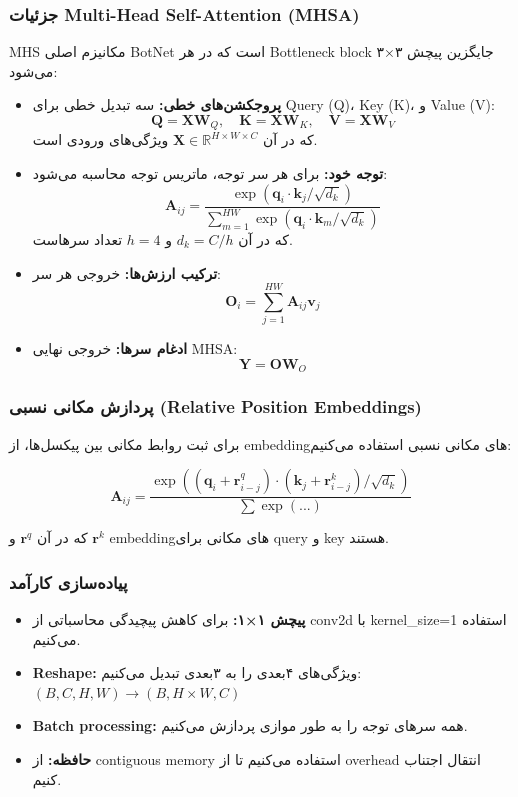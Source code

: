 \documentclass[12pt,a4paper]{article}
\theoremstyle{definition}
\begin{document}
\subsubsection*{جزئیات Multi-Head Self-Attention (MHSA)}
MHS مکانیزم اصلی BotNet است که در هر Bottleneck block جایگزین پیچش ۳×۳ می‌شود:

\begin{itemize}
    \item \textbf{پروجکشن‌های خطی:} سه تبدیل خطی برای Query (Q)، Key (K)، و Value (V):
    \[
    \mathbf{Q} = \mathbf{X} \mathbf{W}_Q, \quad \mathbf{K} = \mathbf{X} \mathbf{W}_K, \quad \mathbf{V} = \mathbf{X} \mathbf{W}_V
    \]
    که در آن $\mathbf{X} \in \mathbb{R}^{H \times W \times C}$ ویژگی‌های ورودی است.

    \item \textbf{توجه خود:} برای هر سر توجه، ماتریس توجه محاسبه می‌شود:
    \[
    \mathbf{A}_{ij} = \frac{\exp(\mathbf{q}_i \cdot \mathbf{k}_j / \sqrt{d_k})}{\sum_{m=1}^{HW} \exp(\mathbf{q}_i \cdot \mathbf{k}_m / \sqrt{d_k})}
    \]
    که در آن $d_k = C/h$ و $h=4$ تعداد سرهاست.

    \item \textbf{ترکیب ارزش‌ها:} خروجی هر سر:
    \[
    \mathbf{O}_i = \sum_{j=1}^{HW} \mathbf{A}_{ij} \mathbf{v}_j
    \]

    \item \textbf{ادغام سرها:} خروجی نهایی MHSA:
    \[
    \mathbf{Y} = \mathbf{O} \mathbf{W}_O
    \]
\end{itemize}

\subsubsection*{پردازش مکانی نسبی (Relative Position Embeddings)}
برای ثبت روابط مکانی بین پیکسل‌ها، از embeddingهای مکانی نسبی استفاده می‌کنیم:

\[
\mathbf{A}_{ij} = \frac{\exp((\mathbf{q}_i + \mathbf{r}_{i-j}^q) \cdot (\mathbf{k}_j + \mathbf{r}_{i-j}^k) / \sqrt{d_k})}{\sum \exp(...)}
\]

که در آن $\mathbf{r}^q$ و $\mathbf{r}^k$ embeddingهای مکانی برای query و key هستند.

\subsubsection*{پیاده‌سازی کارآمد}
\begin{itemize}
    \item \textbf{پیچش ۱×۱:} برای کاهش پیچیدگی محاسباتی از conv2d با kernel_size=1 استفاده می‌کنیم.
    \item \textbf{Reshape:} ویژگی‌های ۴بعدی را به ۳بعدی تبدیل می‌کنیم: $(B, C, H, W) \rightarrow (B, H\times W, C)$
    \item \textbf{Batch processing:} همه سرهای توجه را به طور موازی پردازش می‌کنیم.
    \item \textbf{حافظه:} از contiguous memory استفاده می‌کنیم تا از overhead انتقال اجتناب کنیم.
\end{itemize}
\end{document}
